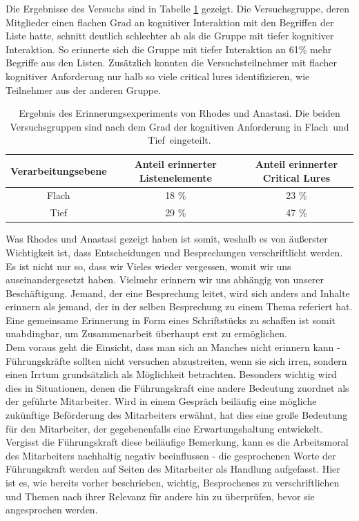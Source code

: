 Die Ergebnisse des Versuchs sind in Tabelle \ref{tab:memory} gezeigt. Die Versuchsgruppe, deren Mitglieder einen flachen Grad an kognitiver Interaktion mit den Begriffen der Liste hatte, schnitt deutlich schlechter ab als die Gruppe mit tiefer kognitiver Interaktion. So erinnerte sich die Gruppe mit tiefer Interaktion an 61\% mehr Begriffe aus den Listen. Zusätzlich konnten die Versuchsteilnehmer mit flacher kognitiver Anforderung nur halb so viele critical lures identifizieren, wie Teilnehmer aus der anderen Gruppe. \\

\begin{table}[htbp]
\begin{center}
\begin{tabular}{|c|c|c|}
\hline
Verarbeitungsebene & Anteil erinnerter Listenelemente & Anteil erinnerter Critical Lures \\ \hline
Flach & 18 \% & 23 \% \\ \hline
Tief & 29 \% & 47 \% \\ \hline
\end{tabular}
\end{center}
\caption{Ergebnis des Erinnerungsexperiments von Rhodes und Anastasi. Die beiden Versuchsgruppen sind nach dem Grad der kognitiven Anforderung in \glqq Flach\grqq~und \glqq Tief\grqq\ eingeteilt.}
\label{tab:memory}
\end{table}

Was Rhodes und Anastasi gezeigt haben ist somit, weshalb es von äußerster Wichtigkeit ist, dass Entscheidungen und Besprechungen verschriftlicht werden. Es ist nicht nur so, dass wir Vieles wieder vergessen, womit wir uns auseinandergesetzt haben. Vielmehr erinnern wir uns abhängig von unserer Beschäftigung. Jemand, der eine Besprechung leitet, wird sich anders and Inhalte erinnern als jemand, der in der selben Besprechung zu einem Thema referiert hat. Eine gemeinsame Erinnerung in Form eines Schriftstücks zu schaffen ist somit unabdingbar, um Zusammenarbeit überhaupt erst zu ermöglichen. \\

Dem voraus geht die Einsicht, dass man sich an Manches nicht erinnern kann - Führungskräfte sollten nicht versuchen abzustreiten, wenn sie sich irren, sondern einen Irrtum grundsätzlich als Möglichkeit betrachten. Besonders wichtig wird dies in Situationen, denen die Führungskraft eine andere Bedeutung zuordnet als der geführte Mitarbeiter. Wird in einem Gespräch beiläufig eine mögliche zukünftige Beförderung des Mitarbeiters erwähnt, hat dies eine große Bedeutung für den Mitarbeiter, der gegebenenfalls eine Erwartungshaltung entwickelt. Vergisst die Führungskraft diese beiläufige Bemerkung, kann es die Arbeitsmoral des Mitarbeiters nachhaltig negativ beeinflussen - die gesprochenen Worte der Führungskraft werden auf Seiten des Mitarbeiter als Handlung aufgefasst. Hier ist es, wie bereits vorher beschrieben, wichtig, Besprochenes zu verschriftlichen und Themen nach ihrer Relevanz für andere hin zu überprüfen, bevor sie angesprochen werden.